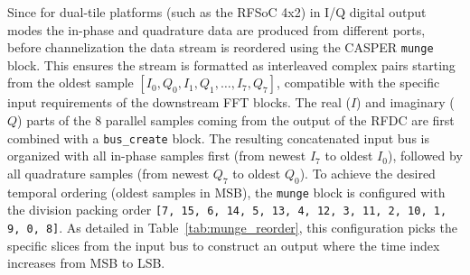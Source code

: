 Since for dual-tile platforms (such as the RFSoC 4x2) in I/Q digital output modes the in-phase and quadrature data are produced from different ports, before channelization the data stream is reordered using the CASPER \texttt{munge} block. This ensures the stream is formatted as interleaved complex pairs starting from the oldest sample $[I_0, Q_0, I_1, Q_1, \dots, I_7, Q_7]$, compatible with the specific input requirements of the downstream FFT blocks. The real ($I$) and imaginary ($Q$) parts of the 8 parallel samples coming from the output of the RFDC are first combined with a \texttt{bus\_create} block. The resulting concatenated input bus is organized with all in-phase samples first (from newest $I_7$ to oldest $I_0$), followed by all quadrature samples (from newest $Q_7$ to oldest $Q_0$). To achieve the desired temporal ordering (oldest samples in MSB), the \texttt{munge} block is configured with the division packing order \texttt{[7, 15, 6, 14, 5, 13, 4, 12, 3, 11, 2, 10, 1, 9, 0, 8]}. As detailed in Table~\ref{tab:munge_reorder}, this configuration picks the specific slices from the input bus to construct an output where the time index increases from MSB to LSB.


